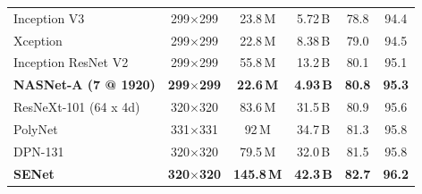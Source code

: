 \begin{table}[h!]
\begin{tabular}{lc|cc|cc}
\midrule
Inception V3~\cite{szegedy2016rethinking} & 299$\times$299 & 23.8\,M & 5.72\,B & 78.8 & 94.4 \\
Xception~\cite{chollet2016xception}& 299$\times$299 & 22.8\,M & 8.38\,B & 79.0 & 94.5 \\
Inception ResNet V2~\cite{szegedy2016inception} & 299$\times$299 & 55.8\,M & 13.2\,B & 80.1 & 95.1 \\
\textbf{NASNet-A (7 @ 1920)} & \textbf{299$\times$299} & \textbf{22.6\,M} & \textbf{4.93\,B} & \textbf{80.8} & \textbf{95.3} \\
\midrule
ResNeXt-101 (64 x 4d)~\cite{xie2016aggregated} & 320$\times$320 & 83.6\,M & 31.5\,B & 80.9 & 95.6 \\
PolyNet~\cite{zhang2016polynet} & 331$\times$331 & 92\,M & 34.7\,B & 81.3 & 95.8 \\
DPN-131~\cite{dualpath} & 320$\times$320 & 79.5\,M & 32.0\,B & 81.5 & 95.8 \\
{\bf SENet~\cite{hu2017squeeze}}& {\bf 320$\times$320} & {\bf 145.8\,M} & {\bf 42.3\,B} & {\bf 82.7} & {\bf 96.2} \\


\end{tabular}
\end{table}

